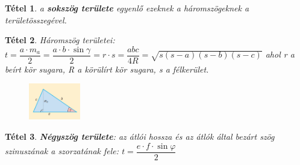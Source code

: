 \documentclass[12pt,a4paper]{article}
\newtheorem{theorem}{Tétel} [section]
\begin{document}
\begin{theorem}
a \textbf{sokszög területe} egyenlő ezeknek a háromszögeknek a területösszegével.
\end{theorem}
\begin{theorem}
Háromszög területei: $t=\dfrac{a\cdot m_a}{2}=\dfrac{a\cdot b\cdot \sin \gamma}{2}=r\cdot s=\dfrac{abc}{4R}=\sqrt{s(s-a)(s-b)(s-c)}$
ahol r a beírt kör sugara, R a körülírt kör sugara, s a félkerület.
\begin{figure}[h]
\centering
\includegraphics[width=0.2\textwidth]{haromszog_teruletkepletei}
\end{figure}
\end{theorem}
\begin{theorem}
\textbf{Négyszög területe}: az átlói hossza és az átlók által bezárt szög szinuszának a szorzatának fele: $t=\dfrac{e\cdot f\cdot \sin \varphi}{2}$
\end{theorem}
\end{document}
